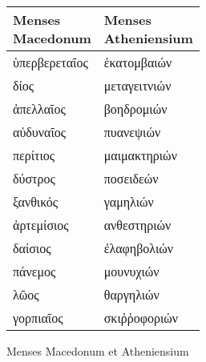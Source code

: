 %
\normalsize
\centering
\begin{tabular}{ l  l }
\toprule
\parbox[b]{6em}{Menses \\ Macedonum} &
\parbox[b]{6em}{Menses \\ Atheniensium} \\
\midrule
\textgreek{ὑπερβερεταῖος}  &\textgreek{ἑκατομβαιών} \\
\textgreek{δίος}           &\textgreek{μεταγειτνιών} \\
\textgreek{ἀπελλαῖος}      &\textgreek{βοηδρομιών} \\
%
\textgreek{αὐδυναῖος}      &\textgreek{πυανεψιών} \\
\textgreek{περίτιος}        &\textgreek{μαιμακτηριών} \\
\textgreek{δύστρος}        &\textgreek{ποσειδεών} \\
%
\textgreek{ξανθικός}       &\textgreek{γαμηλιών} \\
\textgreek{ἀρτεμίσιος}     &\textgreek{ανθεστηριών} \\
\textgreek{δαίσιος}        &\textgreek{ἐλαφηβολιών} \\
%
\textgreek{πάνεμος}        &\textgreek{μουνυχιών} \\
\textgreek{λῶος}          &\textgreek{θαργηλιών} \\
\textgreek{γορπιαῖος}      &\textgreek{σκιῤῥοφοριών} \\
\bottomrule
\end{tabular}
%
\caption{Menses Macedonum et Atheniensium}
\label{tab:p048}
%
